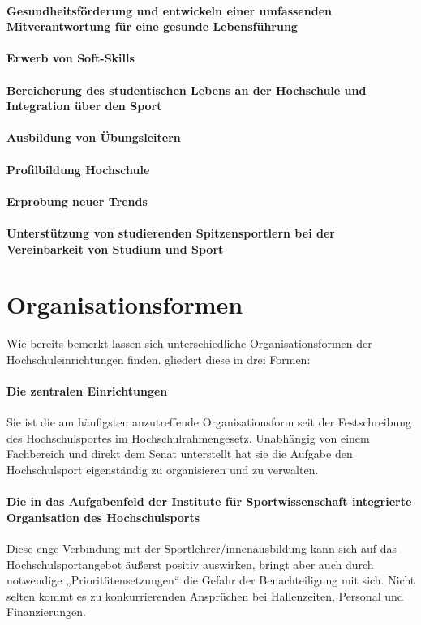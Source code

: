 \paragraph*{Gesundheitsförderung und entwickeln einer umfassenden Mitverantwortung für eine gesunde Lebensführung}
\paragraph*{Erwerb von Soft-Skills}
\paragraph*{Bereicherung des studentischen Lebens an der Hochschule und Integration über den Sport}
\paragraph*{Ausbildung von Übungsleitern}
\paragraph*{Profilbildung Hochschule}
\paragraph*{Erprobung neuer Trends}
\paragraph*{Unterstützung von studierenden Spitzensportlern bei der Vereinbarkeit von Studium und Sport}

\section{Organisationsformen}
Wie bereits bemerkt lassen sich unterschiedliche Organisationsformen der Hochschuleinrichtungen finden. \citet*[S. 15]{Radde.1996} gliedert diese in drei Formen:
\paragraph*{Die zentralen Einrichtungen}
Sie ist die am häufigsten anzutreffende Organisationsform seit der Festschreibung des Hochschulsportes im Hochschulrahmengesetz. Unabhängig von einem Fachbereich und direkt dem Senat unterstellt hat sie die Aufgabe den Hochschulsport eigenständig zu organisieren und zu verwalten.

\paragraph*{Die in das Aufgabenfeld der Institute für Sportwissenschaft integrierte Organisation des Hochschulsports}
Diese enge Verbindung mit der Sportlehrer/innenausbildung kann sich auf das Hochschulsportangebot äußerst positiv auswirken, bringt aber auch durch notwendige „Prioritätensetzungen“ die Gefahr der Benachteiligung mit sich. Nicht selten kommt es zu konkurrierenden Ansprüchen bei Hallenzeiten, Personal und Finanzierungen.

